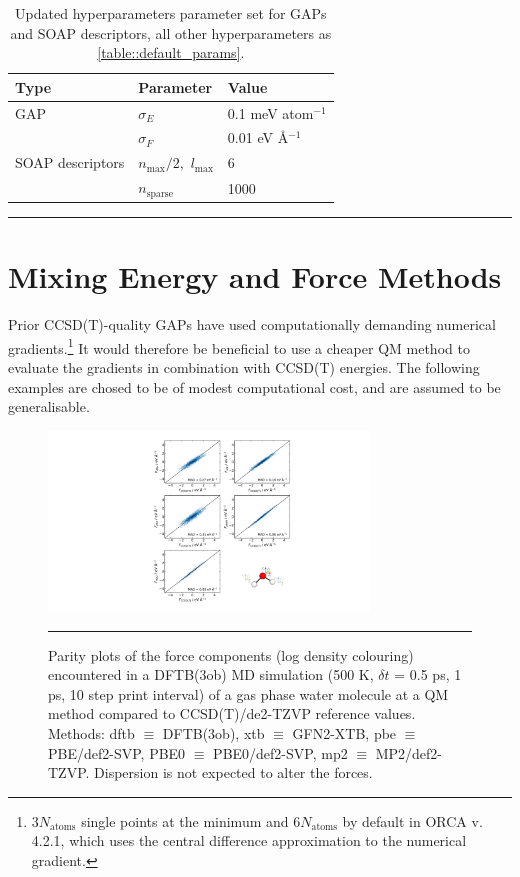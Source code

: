 \documentclass[11pt]{article}
\numberwithin{equation}{subsection}
\begin{document}
\begin{table}[h!]
	\def\arraystretch{1.3}
	\begin{tabularx}{\textwidth}{YYY}
		\hline
		Type&	Parameter	&Value\\
		\hline
		GAP	   &  $\sigma_E$	&  	0.1 meV atom${}^{-1}$ \\
			   &  $\sigma_F$	&  	0.01 eV \AA${}^{-1}$
		\\
		SOAP descriptors  
		&$n_\text{max}/2,$ $l_\text{max}$&6  \\
		 
		&$n_\text{sparse}$ &1000              
	\end{tabularx}
	\hrule
	\vspace{0.1cm}
	\caption{Updated hyperparameters parameter set for GAPs and SOAP descriptors, all other hyperparameters as {\tablename{ \ref{table::default_params}}}.}
	\label{table::updated_params}
\end{table}




\clearpage
\section{Mixing Energy and Force Methods}

Prior CCSD(T)-quality GAPs\cite{gaptrain2021} have used computationally demanding numerical gradients.\footnote{$3N_\text{atoms}$ single points at the minimum and $6N_\text{atoms}$ by default in ORCA v. 4.2.1, which uses the central difference approximation to the numerical gradient.} It would therefore be beneficial to use a cheaper QM method to evaluate the gradients in combination with CCSD(T) energies. The following examples are chosed to be of modest computational cost, and are assumed to be generalisable.


\begin{figure}[h!]
	\centering
	\includegraphics[width=0.76\textwidth]{figSX8.pdf}
	\vspace{0.1cm}
	\hrule
	\vspace{0.1cm}
	\caption{Parity plots of the force components (log density colouring) encountered in a DFTB(3ob) MD simulation (500 K, $\delta t$ = 0.5 ps, 1 ps, 10 step print interval) of a gas phase water molecule at a QM method compared to CCSD(T)/de2-TZVP reference values. Methods: dftb $\equiv$ DFTB(3ob), xtb $\equiv$ GFN2-XTB, pbe $\equiv$ PBE/def2-SVP, PBE0 $\equiv$ PBE0/def2-SVP, mp2 $\equiv$ MP2/def2-TZVP. Dispersion is not expected to alter the forces.}
	\label{fig::SX8}
\end{figure}
\end{document}
